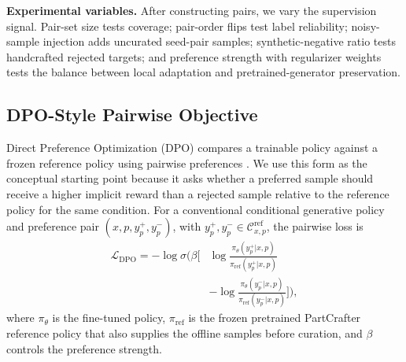 \documentclass[10pt,twocolumn,letterpaper]{article}
\newcommand{\SK}[1]{\textcolor{blue}{[{\sc SK}] #1}}
\begin{document}
\noindent\textbf{Experimental variables.}
After constructing pairs, we vary the supervision signal. Pair-set size tests coverage; pair-order flips test label reliability; noisy-sample injection adds uncurated seed-pair samples; synthetic-negative ratio tests handcrafted rejected targets; and preference strength with regularizer weights tests the balance between local adaptation and pretrained-generator preservation.


\subsection{DPO-Style Pairwise Objective}
\label{sec:preference_objective}
Direct Preference Optimization (DPO) compares a trainable policy against a frozen reference policy using pairwise preferences \cite{rafailov2023direct}. We use this form as the conceptual starting point because it asks whether a preferred sample should receive a higher implicit reward than a rejected sample relative to the reference policy for the same condition. For a conventional conditional generative policy and preference pair $(x,p,y_p^+,y_p^-)$, with $y_p^+,y_p^- \in \mathcal{C}_{x,p}^{\mathrm{ref}}$, the pairwise loss is
{\small
\begin{equation}
\begin{aligned}
\mathcal{L}_{\mathrm{DPO}}
= - \log \sigma \Bigg(
\beta \Big[
&\log \frac{\pi_\theta(y_p^+|x,p)}{\pi_{\mathrm{ref}}(y_p^+|x,p)} \\
&- \log \frac{\pi_\theta(y_p^-|x,p)}{\pi_{\mathrm{ref}}(y_p^-|x,p)}
\Big]
\Bigg),
\end{aligned}
\label{eq:dpo}
\end{equation}
}
where $\pi_\theta$ is the fine-tuned policy, $\pi_{\mathrm{ref}}$ is the frozen pretrained PartCrafter reference policy that also supplies the offline samples before curation, and $\beta$ controls the preference strength.
\end{document}
